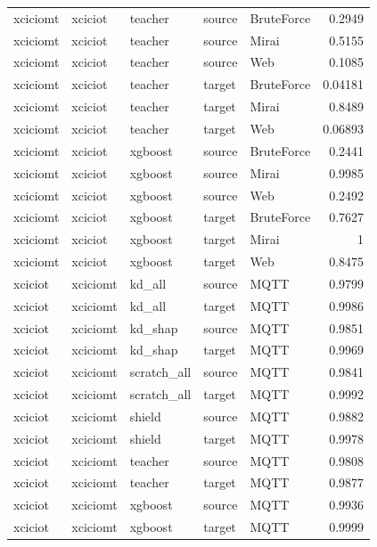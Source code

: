 \begin{table}
\begin{tabular}{lllllr}
xciciomt & xciciot & teacher & source & BruteForce & 0.2949 \\
xciciomt & xciciot & teacher & source & Mirai & 0.5155 \\
xciciomt & xciciot & teacher & source & Web & 0.1085 \\
xciciomt & xciciot & teacher & target & BruteForce & 0.04181 \\
xciciomt & xciciot & teacher & target & Mirai & 0.8489 \\
xciciomt & xciciot & teacher & target & Web & 0.06893 \\
xciciomt & xciciot & xgboost & source & BruteForce & 0.2441 \\
xciciomt & xciciot & xgboost & source & Mirai & 0.9985 \\
xciciomt & xciciot & xgboost & source & Web & 0.2492 \\
xciciomt & xciciot & xgboost & target & BruteForce & 0.7627 \\
xciciomt & xciciot & xgboost & target & Mirai & 1 \\
xciciomt & xciciot & xgboost & target & Web & 0.8475 \\
xciciot & xciciomt & kd_all & source & MQTT & 0.9799 \\
xciciot & xciciomt & kd_all & target & MQTT & 0.9986 \\
xciciot & xciciomt & kd_shap & source & MQTT & 0.9851 \\
xciciot & xciciomt & kd_shap & target & MQTT & 0.9969 \\
xciciot & xciciomt & scratch_all & source & MQTT & 0.9841 \\
xciciot & xciciomt & scratch_all & target & MQTT & 0.9992 \\
xciciot & xciciomt & shield & source & MQTT & 0.9882 \\
xciciot & xciciomt & shield & target & MQTT & 0.9978 \\
xciciot & xciciomt & teacher & source & MQTT & 0.9808 \\
xciciot & xciciomt & teacher & target & MQTT & 0.9877 \\
xciciot & xciciomt & xgboost & source & MQTT & 0.9936 \\
xciciot & xciciomt & xgboost & target & MQTT & 0.9999 \\
\bottomrule
\end{tabular}
\end{table}
